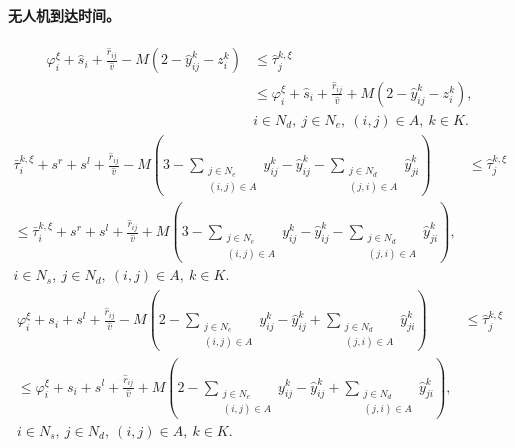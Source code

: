 \documentclass[10pt]{article}
\begin{document}
\paragraph{无人机到达时间。}
\begin{equation}
\begin{aligned}
\varphi_i^\xi+\hat s_i+\frac{\hat r_{ij}}{\hat v}-M(2-\hat y_{ij}^k-z_i^k)
&\leq\hat\tau_j^{k,\xi}\\
&\leq\varphi_i^\xi+\hat s_i+\frac{\hat r_{ij}}{\hat v}+M(2-\hat y_{ij}^k-z_i^k),\\
&i\in N_d,\ j\in N_e,\ (i,j)\in A,\ k\in K.
\end{aligned}\tag{14}
\end{equation}
\begin{equation}
\begin{aligned}
\bar\tau_i^{k,\xi}+s^r+s^l+\frac{\hat r_{ij}}{\hat v}
-M\left(3-\sum_{\substack{j\in N_e\\(i,j)\in A}}y_{ij}^k-\hat y_{ij}^k-\sum_{\substack{j\in N_d\\(j,i)\in A}}\hat y_{ji}^k\right)
&\leq\hat\tau_j^{k,\xi}\\
\leq\bar\tau_i^{k,\xi}+s^r+s^l+\frac{\hat r_{ij}}{\hat v}
+M\left(3-\sum_{\substack{j\in N_e\\(i,j)\in A}}y_{ij}^k-\hat y_{ij}^k-\sum_{\substack{j\in N_d\\(j,i)\in A}}\hat y_{ji}^k\right),&\\
i\in N_s,\ j\in N_d,\ (i,j)\in A,\ k\in K.&
\end{aligned}\tag{15a}
\end{equation}
\begin{equation}
\begin{aligned}
\varphi_i^\xi+s_i+s^l+\frac{\hat r_{ij}}{\hat v}
-M\left(2-\sum_{\substack{j\in N_e\\(i,j)\in A}}y_{ij}^k-\hat y_{ij}^k+\sum_{\substack{j\in N_d\\(j,i)\in A}}\hat y_{ji}^k\right)
&\leq\hat\tau_j^{k,\xi}\\
\leq\varphi_i^\xi+s_i+s^l+\frac{\hat r_{ij}}{\hat v}
+M\left(2-\sum_{\substack{j\in N_e\\(i,j)\in A}}y_{ij}^k-\hat y_{ij}^k+\sum_{\substack{j\in N_d\\(j,i)\in A}}\hat y_{ji}^k\right),&\\
i\in N_s,\ j\in N_d,\ (i,j)\in A,\ k\in K.&
\end{aligned}\tag{15b}
\end{equation}
\end{document}
